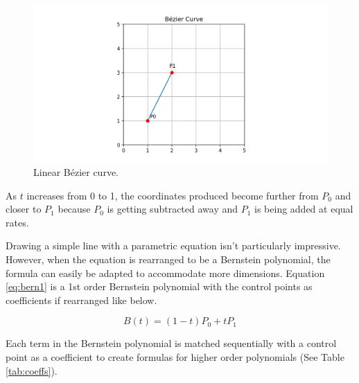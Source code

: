 \documentclass[12pt,letterpaper]{article}
\begin{document}
\begin{figure}[H]
    \includegraphics[width=15cm]{Figure_3}
    \centering
    \caption{Linear B\'ezier curve.}
    \label{fig:bez2}
\end{figure}

As $t$ increases from 0 to 1, the coordinates produced become further from $P_0$ and closer to $P_1$ because $P_0$ is getting subtracted away and $P_1$ is being added at equal rates. 

Drawing a simple line with a parametric equation isn’t particularly impressive. However, when the equation is rearranged to be a Bernstein polynomial, the formula can easily be adapted to accommodate more dimensions. Equation \ref{eq:bern1} is a 1st order Bernstein polynomial with the control points as coefficients if rearranged like below.

\begin{equation}
    \label{eq:bern1}
    B(t) = (1-t)P_0 + t P_1
\end{equation}

Each term in the Bernstein polynomial is matched sequentially with a control point as a coefficient to create formulas for higher order polynomials (See Table \ref{tab:coeffs}).
\end{document}
